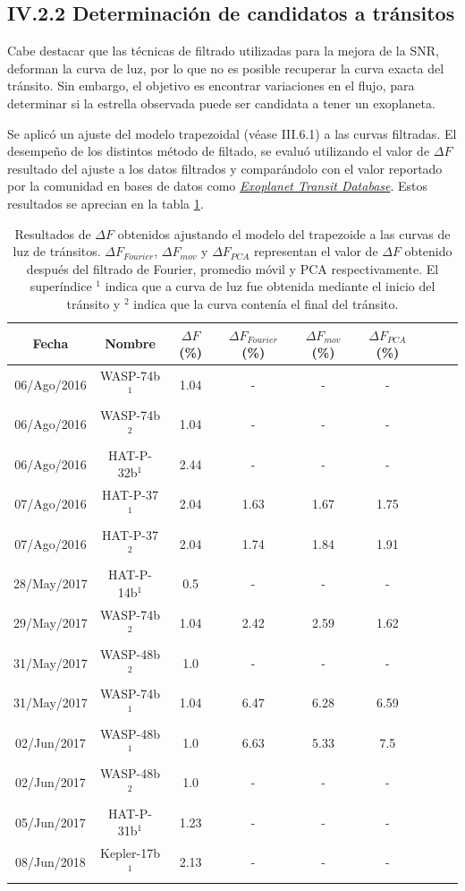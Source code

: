 \subsection*{IV.2.2 Determinación de candidatos a tránsitos}

Cabe destacar que las técnicas de filtrado utilizadas para la mejora de la SNR, deforman la curva de luz, por lo que no es posible recuperar la curva exacta del tránsito. Sin embargo, el objetivo es encontrar variaciones en el flujo, para determinar si la estrella observada puede ser candidata a tener un exoplaneta.

Se aplicó un ajuste del modelo trapezoidal (véase III.6.1) a las curvas filtradas. El desempeño de los distintos método de filtado, se evaluó utilizando el valor de $\Delta F$ resultado del ajuste a los datos filtrados y comparándolo con el valor reportado por la comunidad en bases de datos como \href{http://var2.astro.cz/ETD/index.php}{\textit{Exoplanet Transit Database}}. Estos resultados se aprecian en la tabla \ref{tab_resultados_profundidad}.


\begin{table}
	\centering
	\begin{tabular}{ccccccccc}
	\hline 
	Fecha & Nombre & $\Delta F$ (\%) & $\Delta F_{Fourier}$ (\%) &  $\Delta F_{mov}$ (\%) & $\Delta F_{PCA}$ (\%) \\ 
	\hline
	06/Ago/2016 & WASP-74b$^{1}$ & 1.04 & - & - & - \\ 
	06/Ago/2016 & WASP-74b$^{2}$ & 1.04 & - & - & - \\
	06/Ago/2016 & HAT-P-32b$^{1}$ & 2.44 & - & - & - \\
	07/Ago/2016 & HAT-P-37$^{1}$ & 2.04 & 1.63 & 1.67 & 1.75 \\ 
	07/Ago/2016 & HAT-P-37$^{2}$ & 2.04 & 1.74 & 1.84 & 1.91 \\ 
	28/May/2017 & HAT-P-14b$^{1}$ & 0.5 & - & - & - \\ 
	29/May/2017 & WASP-74b$^{2}$ & 1.04 & 2.42 & 2.59 & 1.62 \\ 
	31/May/2017 & WASP-48b$^{2}$ & 1.0 & - & - & - \\  
	31/May/2017 & WASP-74b$^{1}$ & 1.04 & 6.47 & 6.28 & 6.59 \\
	02/Jun/2017 & WASP-48b$^{1}$ & 1.0 & 6.63 & 5.33 & 7.5 \\
	02/Jun/2017 & WASP-48b$^{2}$ & 1.0 & - & - & - \\
	05/Jun/2017 & HAT-P-31b$^{1}$ & 1.23 & - & - & - \\
	08/Jun/2018 & Kepler-17b$^{1}$ & 2.13 & - & - & - \\ 
	\hline 
	\end{tabular} 
	\caption{Resultados de $\Delta F$ obtenidos ajustando el modelo del trapezoide a las curvas de luz de tránsitos. $\Delta F_{Fourier}$, $\Delta F_{mov}$ y $\Delta F_{PCA}$ representan el valor de $\Delta F$ obtenido después del filtrado de Fourier, promedio móvil y PCA respectivamente. El superíndice $^{1}$ indica que a curva de luz fue obtenida mediante el inicio del tránsito y $^{2}$ indica que la curva contenía el final del tránsito.}
	\label{tab_resultados_profundidad}
	\end{table}

